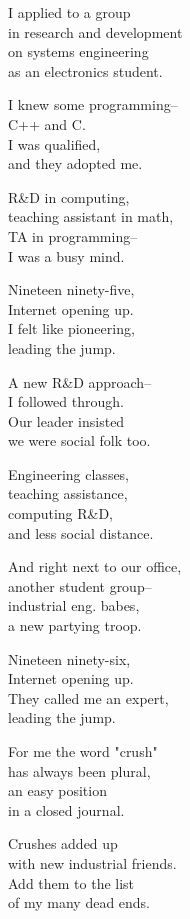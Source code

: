 \begin{lyrics}
I applied to a group\\
in research and development\\
on systems engineering\\
as an electronics student.

I knew some programming--\\
C++ and C.\\
I was qualified,\\
and they adopted me.

R\&D in computing,\\
teaching assistant in math,\\
TA in programming--\\
I was a busy mind.

Nineteen ninety-five,\\
Internet opening up.\\
I felt like pioneering,\\
leading the jump.

A new R\&D approach--\\
I followed through.\\
Our leader insisted\\
we were social folk too.

Engineering classes,\\
teaching assistance,\\
computing R\&D,\\
and less social distance.

And right next to our office,\\
another student group--\\
industrial eng. babes,\\
a new partying troop.

Nineteen ninety-six,\\
Internet opening up.\\
They called me an expert,\\
leading the jump.

For me the word "crush"\\
has always been plural,\\
an easy position\\
in a closed journal.

Crushes added up\\
with new industrial friends.\\
Add them to the list\\
of my many dead ends.


\end{lyrics}
